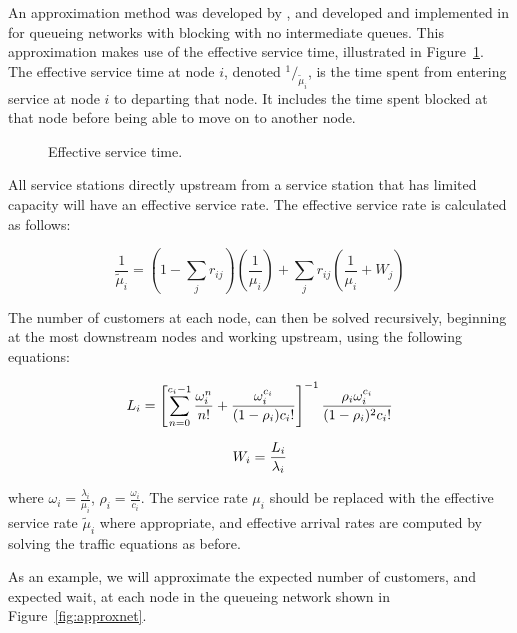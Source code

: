 \documentclass{article}
\begin{document}
An approximation method was developed by \cite{takahashi80}, and developed and implemented in \cite{koizumietal05} for queueing networks with blocking with no intermediate queues.
This approximation makes use of the effective service time, illustrated in Figure~\ref{fig:effectiveservicetime}.
The effective service time at node $i$, denoted $^1 / _{\tilde{\mu}_i}$, is the time spent from entering service at node $i$ to departing that node.
It includes the time spent blocked at that node before being able to move on to another node.

\begin{figure}[H]
    
    \caption{Effective service time.}
    \label{fig:effectiveservicetime}
\end{figure}

All service stations directly upstream from a service station that has limited capacity will have an effective service rate.
The effective service rate is calculated as follows:

\begin{equation}
    \frac{1}{\tilde{\mu}_i} = \left( 1 - \sum_j r_{ij} \right) \left( \frac{1}{\mu_i} \right) + \sum_j r_{ij} \left( \frac{1}{\mu_i} + W_j \right)
\end{equation}

The number of customers at each node, can then be solved recursively, beginning at the most downstream nodes and working upstream, using the following equations:

\begin{equation} \label{eq:L}
    L_i = \left[ \sum_{n=0}^{c_i-1} {\omega_i^n \over n!} + {\omega_i^{c_i} \over (1 - \rho_i)c_i! } \right]^{-1} \frac{\rho_i \omega_i^{c_i}}{(1-\rho_i)^2 c_i!}
\end{equation}

\begin{equation}
    W_i = {L_i \over \lambda_i}
\end{equation}

where $\omega_i = \frac{\lambda_i}{\mu_i}$, $\rho_i = \frac{\omega_i}{c_i}$.
The service rate $\mu_i$ should be replaced with the effective service rate $\tilde{\mu}_i$ where appropriate, and effective arrival rates are computed by solving the traffic equations as before.

As an example, we will approximate the expected number of customers, and expected wait, at each node in the queueing network shown in Figure~\ref{fig:approxnet}.
\end{document}
